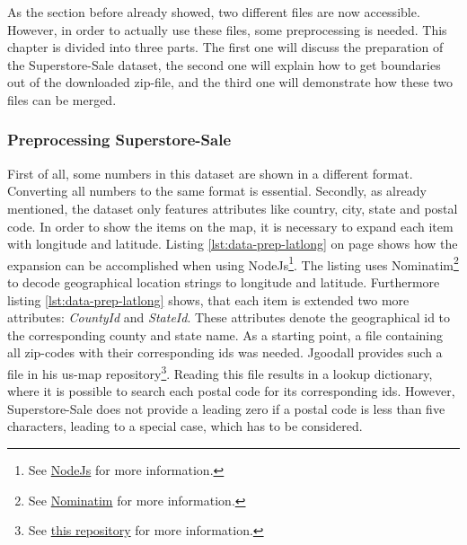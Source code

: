 As the section before already showed, two different files are now accessible. However, in order to actually use these files, some preprocessing is needed. This chapter is divided into three parts. The first one will discuss the preparation of the Superstore-Sale dataset, the second one will explain how to get boundaries out of the downloaded zip-file, and the third one will demonstrate how these two files can be merged.

\subsubsection{Preprocessing Superstore-Sale}
First of all, some numbers in this dataset are shown in a different format. Converting all numbers to the same format is essential.
Secondly, as already mentioned, the dataset only features attributes like country, city, state and postal code. In order to show the items on the map, it is necessary to expand each item with longitude and latitude. Listing \ref{lst:data-prep-latlong} on page \pageref{lst:data-prep-latlong} shows how the expansion can be accomplished when using NodeJs\footnote{See \href{https://nodejs.org/en/}{NodeJs} for more information.}. The listing uses Nominatim\footnote{See \href{https://nominatim.openstreetmap.org/}{Nominatim} for more information.} to decode geographical location strings to longitude and latitude. Furthermore listing \ref{lst:data-prep-latlong} shows, that each item is extended two more attributes: \textit{CountyId} and \textit{StateId}. These attributes denote the geographical id to the corresponding county and state name. As a starting point, a file containing all zip-codes with their corresponding ids was needed. Jgoodall provides such a file in his us-map repository\footnote{See \href{https://github.com/jgoodall/us-maps/}{this repository} for more information.}. Reading this file results in a lookup dictionary, where it is possible to search each postal code for its corresponding ids. However, Superstore-Sale does not provide a leading zero if a postal code is less than five characters, leading to a special case, which has to be considered.


